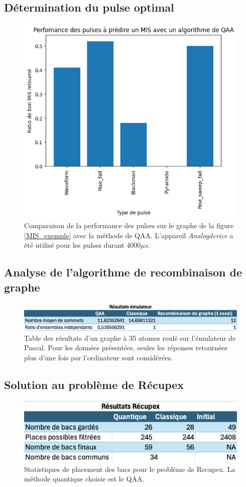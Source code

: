 \documentclass[11pt]{article}
\begin{document}
\subsection{Détermination du pulse optimal}
\begin{figure}[H]
    \centering
    \includegraphics[width=0.49\linewidth]{images/pusle_comp.png}
    \caption{Comparaison de la performance des pulses sur le graphe de la figure \ref{MIS_exemple} avec la méthode de QAA. L'appareil \textit{Analogdevice} a été utilisé pour les pulses durant 4000$\mu s$.}
    \label{pulse_comp}
\end{figure}

\subsection{Analyse de l'algorithme de recombinaison de graphe}
\begin{figure}[H]
    \centering
    \includegraphics[width=0.70\linewidth]{images/table_emul.png}
    \caption{Table des résultats d'un graphe à 35 atomes roulé sur l'émulateur de Pascal. Pour les données présentées, seules les réponses retournées plus d'une fois par l'ordinateur sont considérées.}
    \label{emul_stats}
\end{figure}

\subsection{Solution au problème de Récupex}
\begin{figure}[H]
    \centering
    \includegraphics[width=0.49\linewidth]{images/recupex_solver.png}
    \caption{Statistiques de placement des bacs pour le problème de Recupex. La méthode quantique choisie est le QAA.}
    \label{recupex_stats}
\end{figure}
\end{document}
